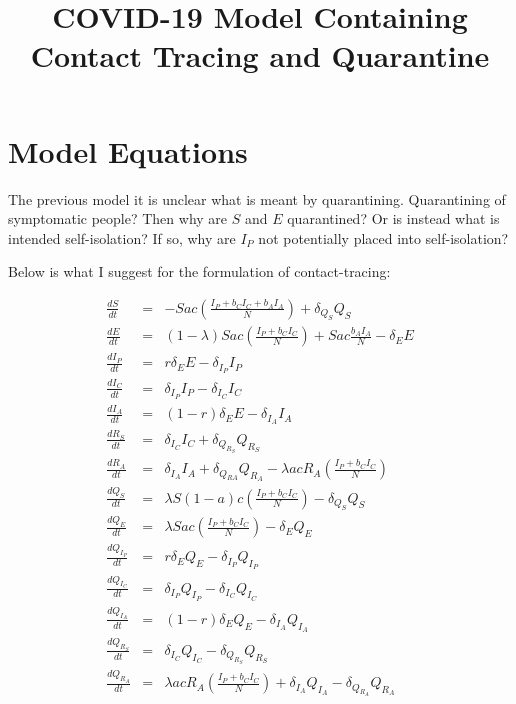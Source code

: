 \documentclass[12pt]{article}
\title{COVID-19 Model Containing Contact Tracing and Quarantine}
\date{}
\begin{document}
 

\maketitle

\section{Model Equations} \label{equations}

The previous model it is unclear what is meant by quarantining. Quarantining of symptomatic people? Then why are $S$ and $E$ quarantined? Or is instead what is intended self-isolation? If so, why are $I_P$ not potentially placed into self-isolation?

Below is what I suggest for the formulation of contact-tracing:

\begin{eqnarray}
\frac{dS}{dt} &=&  - S a c \left( \frac{I_P + b_CI_C + b_AI_A}{N}\right)  + \delta_{Q_S}  Q_S \\
\frac{dE}{dt} &=& (1-\lambda)S a c \left( \frac{I_P + b_CI_C}{N}\right) + S ac \frac{b_A I_A}{N}  - \delta_E E \\
\frac{dI_P}{dt} &=& r\delta_E E - \delta_{I_P} I_P\\
\frac{dI_C}{dt} &=& \delta_{I_P} I_P - \delta_{I_C} I_C\\
\frac{dI_A}{dt} &=& (1-r) \delta_E E - \delta_{I_A} I_A\\
\frac{dR_S}{dt} &=& \delta_{I_C} I_C +  \delta_{Q_{R_S}} Q_{R_S} \\
\frac{dR_A}{dt} &=& \delta_{I_A} I_A + \delta_{Q_{RA}} Q_{R_A} - \lambda a c R_A \left( \frac{I_P + b_CI_C}{N}\right)  \\
\frac{dQ_S}{dt} &=& \lambda S (1-a) c \left( \frac{I_P + b_CI_C}{N}\right) - \delta_{Q_S}  Q_S \\
\frac{dQ_E}{dt} &=&\lambda S a c \left( \frac{I_P + b_CI_C}{N}\right)  - \delta_E Q_E\\
\frac{dQ_{I_P}}{dt} &=& r \delta_E Q_E -\delta_{I_P} Q_{I_P}\\
\frac{dQ_{I_C}}{dt} &=& \delta_{I_P} Q_{I_P} - \delta_{I_C} Q_{I_C}\\
\frac{dQ_{I_A}}{dt} &=&  (1-r)\delta_E Q_E -\delta_{I_A} Q_{I_A}\\
\frac{dQ_{R_S}}{dt} &=& \delta_{I_C} Q_{I_C} - \delta_{Q_{R_S}} Q_{R_S}\\
\frac{dQ_{R_A}}{ dt} &=& \lambda a c R_A \left( \frac{I_P + b_CI_C}{N}\right) +\delta_{I_A} Q_{I_A} - \delta_{Q_{R_A}}Q_{R_A}
\end{eqnarray}
\end{document}
